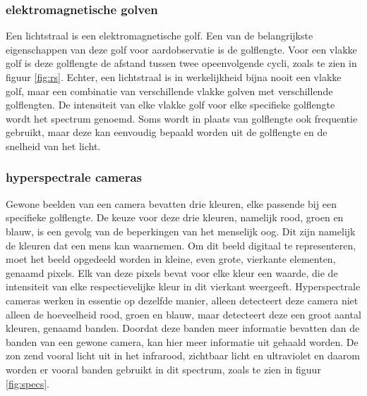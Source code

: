 \documentclass[12pt]{report}
\begin{document}
\subsubsection{elektromagnetische golven}
Een lichtstraal is een elektromagnetische golf. Een van de belangrijkste eigenschappen van deze golf voor aardobservatie is de golflengte. Voor een vlakke golf is deze golflengte de afstand tussen twee opeenvolgende cycli, zoals te zien in figuur \ref{fig:rs}. Echter, een lichtstraal is in werkelijkheid bijna nooit een vlakke golf, maar een combinatie van verschillende vlakke golven met verschillende golflengten. De intensiteit van elke vlakke golf voor elke specifieke golflengte wordt het spectrum genoemd. Soms wordt in plaats van golflengte ook frequentie gebruikt, maar deze kan eenvoudig bepaald worden uit de golflengte en de snelheid van het licht.

\subsubsection{hyperspectrale cameras}
Gewone beelden van een camera bevatten drie kleuren, elke passende bij een specifieke golflengte. De keuze voor deze drie kleuren, namelijk rood, groen en blauw, is een gevolg van de beperkingen van het menselijk oog. Dit zijn namelijk de kleuren dat een mens kan waarnemen. Om dit beeld digitaal te representeren, moet het beeld opgedeeld worden in kleine, even grote, vierkante elementen, genaamd pixels. Elk van deze pixels bevat voor elke kleur een waarde, die de intensiteit van elke respectievelijke kleur in dit vierkant weergeeft. Hyperspectrale cameras werken in essentie op dezelfde manier, alleen detecteert deze camera niet alleen de hoeveelheid rood, groen en blauw, maar detecteert deze een groot aantal kleuren, genaamd banden. Doordat deze banden meer informatie bevatten dan de banden van een gewone camera, kan hier meer informatie uit gehaald worden. De zon zend vooral licht uit in het infrarood, zichtbaar licht en ultraviolet en daarom worden er vooral banden gebruikt in dit spectrum, zoals te zien in figuur \ref{fig:specs}.  
\end{document}
